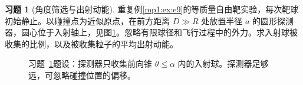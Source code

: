 \documentclass[11pt,openany,fontset=fandol]{ctexbook}
\theoremstyle{definition}\newtheorem{example}{例}[chapter]\newtheorem{exercise}{习题}[chapter]
\begin{document}
\par\medskip\noindent\begin{minipage}{\textwidth}
\begin{exercise}[角度筛选与出射动能]\label{mp1:pr:p12}
重复例\ref{mp1:ex:e9}的等质量自由靶实验，每次靶球初始静止。以碰撞点为近似原点，在前方距离 $D\gg R$ 处放置半径 $a$ 的圆形探测器，圆心位于入射轴上，见图\ref{mp1:fig:p12-q}。忽略有限球径和飞行过程中的外力。求入射球被收集的比例，以及被收集粒子的平均出射动能。
\end{exercise}

\begin{figure}[H]\centering

\caption{习题~\ref{mp1:pr:p12}题设：探测器只收集前向锥 $\theta\le\alpha$ 内的入射球。探测器足够远，可忽略碰撞位置的偏移。}\label{mp1:fig:p12-q}
\end{figure}

\end{minipage}\par\medskip
\end{document}
